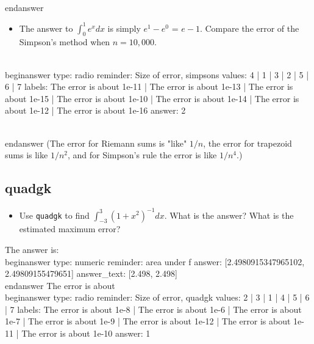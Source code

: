 \documentclass[12pt]{article}
\begin{document}
\\end{answer}
\begin{itemize}\item The answer to $\int_0^1 e^x dx$ is simply $e^1 - e^0$ =   $e-1$. Compare the error of the Simpson's method when $n=10,000$.\end{itemize}
\\begin{answer}
type: radio
reminder: Size of error, simpsons
values: 4 | 1 | 3 | 2 | 5 | 6 | 7
labels: The error is about 1e-11 | The error is about 1e-13 | The error is about 1e-15 | The error is about 1e-10 | The error is about 1e-14 | The error is about 1e-12 | The error is about 1e-16
answer: 2

\\end{answer}
\newline
(The error for Riemann sums is "like" $1/n$, the error for trapezoid sums is like $1/n^2$, and for Simpson's rule the error is like $1/n^4$.)\subsection{quadgk}\begin{itemize}\item Use \texttt{quadgk} to find $\int_{-3}^{3} (1 + x^2)^{-1} dx$. What is the answer? What is the estimated maximum error?\end{itemize}\newline
The answer is:
\\begin{answer}
    type: numeric
    reminder: area under f
    answer: [2.4980915347965102, 2.49809155479651]
    answer_text: [2.498, 2.498] 
\\end{answer}
\newline
The error is about
\\begin{answer}
type: radio
reminder: Size of error, quadgk
values: 2 | 3 | 1 | 4 | 5 | 6 | 7
labels: The error is about 1e-8 | The error is about 1e-6 | The error is about 1e-7 | The error is about 1e-9 | The error is about 1e-12 | The error is about 1e-11 | The error is about 1e-10
answer: 1
\end{document}

